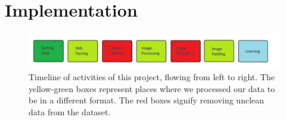 \section{Implementation}

\begin{figure}[ht]
  \centering
  \includegraphics[width=\textwidth]{images/Timeline.png}
  \caption{
    Timeline of activities of this project, flowing from left to right.  The
    yellow-green boxes represent places where we processed our data to be in a
    different format.  The red boxes signify removing unclean data from the
    dataset.
    }
  \label{fig:timeline}
\end{figure}


